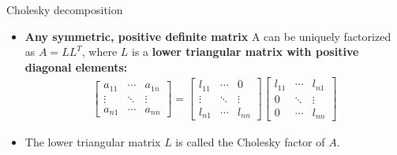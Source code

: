 \begin{frame}{Cholesky decomposition}
\begin{itemize}
    \item \textbf{Any symmetric, positive definite matrix} A can be uniquely factorized as $A = LL^T$, where $L$ is a \textbf{lower triangular matrix with positive diagonal elements:}
    \begin{align}
        \begin{bmatrix}
        a_{11} & \cdots & a_{1n} \\
        \vdots & \ddots & \vdots \\
        a_{n1} & \cdots & a_{nn}
        \end{bmatrix}
        =
        \begin{bmatrix}
        l_{11} & \cdots & 0 \\
        \vdots & \ddots & \vdots \\
        l_{n1} & \cdots & l_{nn}
        \end{bmatrix}
        \begin{bmatrix}
        l_{11} & \cdots & l_{n1} \\
        0 & \ddots & \vdots \\
        0 & \cdots & l_{nn}
        \end{bmatrix}
       \end{align}
    \item The lower triangular matrix $L$ is called the Cholesky factor of $A$.
\end{itemize}    
\end{frame}





